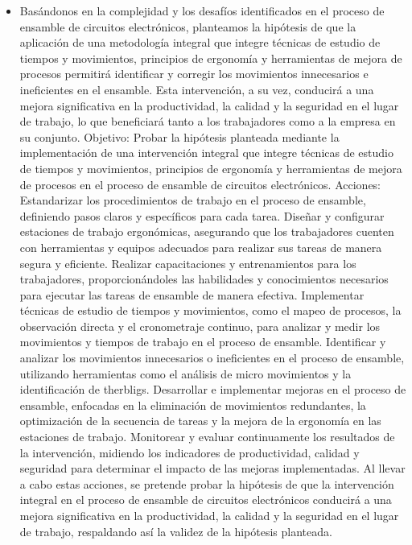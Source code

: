     \begin{itemize}
        \item Basándonos en la complejidad y los desafíos identificados en el proceso de ensamble de circuitos electrónicos, planteamos la hipótesis de que la aplicación de una metodología integral que integre técnicas de estudio de tiempos y movimientos, principios de ergonomía y herramientas de mejora de procesos permitirá identificar y corregir los movimientos innecesarios e ineficientes en el ensamble. Esta intervención, a su vez, conducirá a una mejora significativa en la productividad, la calidad y la seguridad en el lugar de trabajo, lo que beneficiará tanto a los trabajadores como a la empresa en su conjunto.
    Objetivo:
    Probar la hipótesis planteada mediante la implementación de una intervención integral que integre técnicas de estudio de tiempos y movimientos, principios de ergonomía y herramientas de mejora de procesos en el proceso de ensamble de circuitos electrónicos.
    Acciones:
    Estandarizar los procedimientos de trabajo en el proceso de ensamble, definiendo pasos claros y específicos para cada tarea.
    Diseñar y configurar estaciones de trabajo ergonómicas, asegurando que los trabajadores cuenten con herramientas y equipos adecuados para realizar sus tareas de manera segura y eficiente.
    Realizar capacitaciones y entrenamientos para los trabajadores, proporcionándoles las habilidades y conocimientos necesarios para ejecutar las tareas de ensamble de manera efectiva.
    Implementar técnicas de estudio de tiempos y movimientos, como el mapeo de procesos, la observación directa y el cronometraje continuo, para analizar y medir los movimientos y tiempos de trabajo en el proceso de ensamble.
    Identificar y analizar los movimientos innecesarios o ineficientes en el proceso de ensamble, utilizando herramientas como el análisis de micro movimientos y la identificación de therbligs.
    Desarrollar e implementar mejoras en el proceso de ensamble, enfocadas en la eliminación de movimientos redundantes, la optimización de la secuencia de tareas y la mejora de la ergonomía en las estaciones de trabajo.\cite{book}
    Monitorear y evaluar continuamente los resultados de la intervención, midiendo los indicadores de productividad, calidad y seguridad para determinar el impacto de las mejoras implementadas.
    Al llevar a cabo estas acciones, se pretende probar la hipótesis de que la intervención integral en el proceso de ensamble de circuitos electrónicos conducirá a una mejora significativa en la productividad, la calidad y la seguridad en el lugar de trabajo, respaldando así la validez de la hipótesis planteada.
    \end{itemize}
